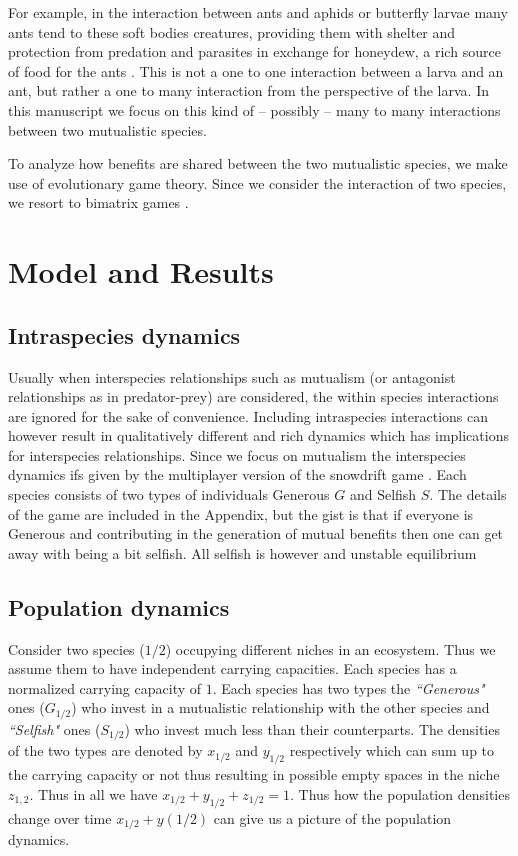 \documentclass{pnastwo}
\begin{document}
\begin{article}
For example, in the interaction between ants and aphids or butterfly larvae \cite{pierce:BES:1987,hoelldobler:book:1990} many ants tend to these soft bodies creatures, providing them with shelter and protection from predation and parasites in exchange for honeydew, a rich source of food for the ants \cite{hill:OEC:1989,stadler:book:2008}.
This is not a one to one interaction between a larva and an ant, but rather a one to many interaction from the perspective of the larva.
In this manuscript we focus on this kind of -- possibly -- many to many interactions between two mutualistic species.

To analyze how benefits are shared between the two mutualistic species, we make use of evolutionary game theory.
Since we consider the interaction of two species, we resort to bimatrix games
\cite{weibull:book:1995,hofbauer:JMB:1996,hofbauer:book:1998}.



\section{Model and Results}

\subsection{Intraspecies dynamics}

Usually when interspecies relationships such as mutualism (or antagonist relationships as in predator-prey) are considered, the within species interactions are ignored for the sake of convenience. Including intraspecies interactions can however result in qualitatively different and rich dynamics which has implications for interspecies relationships.
Since we focus on mutualism the interspecies dynamics  ifs given by the multiplayer version of the snowdrift game \cite{bergstrom:PNAS:2003,souza:JTB:2009,gokhale:PRSB:2012}.
Each species consists of two types of individuals Generous $G$ and Selfish $S$. 
The details of the game are included in the Appendix, but the gist is that if everyone is Generous and contributing in the generation of mutual benefits then one can get away with being a bit selfish. All selfish is however and unstable equilibrium 

\subsection{Population dynamics}
Consider two species ($1/2$) occupying different niches in an ecosystem.
Thus we assume them to have independent carrying capacities. Each species has a normalized carrying capacity of $1$. Each species has two types the \textit{``Generous"} ones ($G_{1/2}$) who invest in a mutualistic relationship with the other species and \textit{``Selfish"} ones ($S_{1/2}$) who invest much less than their counterparts. The densities of the two types are denoted by $x_{1/2}$ and $y_{1/2}$ respectively which can sum up to the carrying capacity or not thus resulting in possible empty spaces in the niche $z_{1,2}$. Thus in all we have $x_{1/2} + y_{1/2} + z_{1/2} = 1$.
Thus how the population densities change over time $x_{1/2} + y(1/2)$ can give us a picture of the population dynamics.

\end{article}
\end{document}
